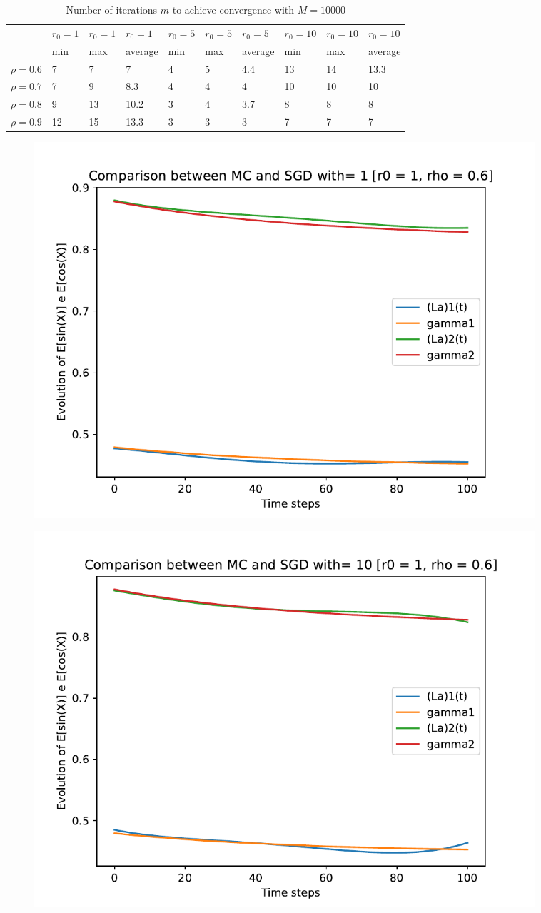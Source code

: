 \documentclass[a4paper,11pt,openright]{report}
\begin{document}
\begin{table}[H]
\centering
\addtolength{\leftskip}{-1.5cm}
\addtolength{\rightskip}{-1.5cm}
\begin{tabular}{|c|lllllllll|}
\hline
$ $ & $r_0 = 1$ & $r_0 = 1$ & $r_0 = 1$ & $r_0 = 5$ & $r_0 = 5$ & $r_0 = 5$ & $r_0 = 10$ & $r_0 = 10$ & $r_0 = 10$  \\
$ $ & min & max & average & min & max & average & min & max & average \\ 
\hline
$\rho = 0.6$ & 7 & 7 & 7 & 4 & 5 & 4.4 & 13 & 14 & 13.3 \\

$\rho = 0.7$ & 7 & 9 & 8.3 & 4 & 4 & 4 & 10 & 10 & 10\\

$\rho = 0.8$ & 9 & 13 & 10.2 & 3 & 4 & 3.7 & 8 & 8 & 8\\

$\rho = 0.9$ & 12 & 15 & 13.3 & 3 & 3 & 3 & 7 & 7 & 7\\
\hline
\end{tabular}
\caption{Number of iterations $m$ to achieve convergence with $M = 10000$}
\end{table}
\begin{figure}[H]
\centering
\includegraphics[width=0.9\textwidth]{images/graphs T = 1/n = 4, M = 1 sine and cosine.pdf}
\end{figure}
\begin{figure}[H]
\centering
\includegraphics[width=0.9\textwidth]{images/graphs T = 1/n = 4, M = 10 sine and cosine.pdf}
\end{figure}
\end{document}
